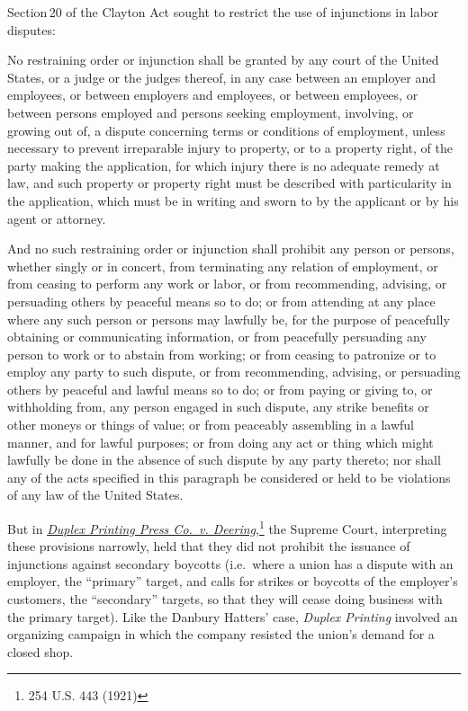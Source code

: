 \documentclass[
  letterpaper,
  11pt,
  DIV=9,
  openright]{scrbook}
\renewenvironment{quote}{
  \list{}{\leftmargin=2em\rightmargin=2em}
  \item\relax\small
}
{\endlist}
\begin{document}
Section\,20 of the Clayton Act sought to restrict the use of injunctions
in labor disputes:

\begin{quote}
No restraining order or injunction shall be granted by any court of the
United States, or a judge or the judges thereof, in any case between an
employer and employees, or between employers and employees, or between
employees, or between persons employed and persons seeking employment,
involving, or growing out of, a dispute concerning terms or conditions
of employment, unless necessary to prevent irreparable injury to
property, or to a property right, of the party making the application,
for which injury there is no adequate remedy at law, and such property
or property right must be described with particularity in the
application, which must be in writing and sworn to by the applicant or
by his agent or attorney.

And no such restraining order or injunction shall prohibit any person or
persons, whether singly or in concert, from terminating any relation of
employment, or from ceasing to perform any work or labor, or from
recommending, advising, or persuading others by peaceful means so to do;
or from attending at any place where any such person or persons may
lawfully be, for the purpose of peacefully obtaining or communicating
information, or from peacefully persuading any person to work or to
abstain from working; or from ceasing to patronize or to employ any
party to such dispute, or from recommending, advising, or persuading
others by peaceful and lawful means so to do; or from paying or giving
to, or withholding from, any person engaged in such dispute, any strike
benefits or other moneys or things of value; or from peaceably
assembling in a lawful manner, and for lawful purposes; or from doing
any act or thing which might lawfully be done in the absence of such
dispute by any party thereto; nor shall any of the acts specified in
this paragraph be considered or held to be violations of any law of the
United States.
\end{quote}

But in
\href{https://scholar.google.com/scholar_case?case=2440261841066410970}{\emph{Duplex
Printing Press Co.~v. Deering}},\footnote{254 U.S. 443 (1921)} the
Supreme Court, interpreting these provisions narrowly, held that they
did not prohibit the issuance of injunctions against secondary boycotts
(i.e.~where a union has a dispute with an employer, the ``primary''
target, and calls for strikes or boycotts of the employer's customers,
the ``secondary'' targets, so that they will cease doing business with
the primary target). Like the Danbury Hatters' case, \emph{Duplex
Printing} involved an organizing campaign in which the company resisted
the union's demand for a closed shop.
\end{document}
